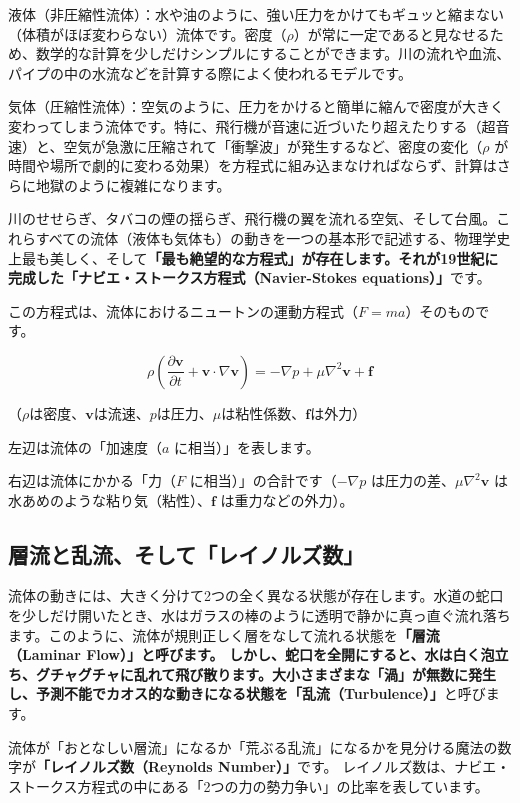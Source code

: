 液体（非圧縮性流体）：水や油のように、強い圧力をかけてもギュッと縮まない（体積がほぼ変わらない）流体です。密度（\ensuremath{\rho}）が常に一定であると見なせるため、数学的な計算を少しだけシンプルにすることができます。川の流れや血流、パイプの中の水流などを計算する際によく使われるモデルです。

気体（圧縮性流体）：空気のように、圧力をかけると簡単に縮んで密度が大きく変わってしまう流体です。特に、飛行機が音速に近づいたり超えたりする（超音速）と、空気が急激に圧縮されて「衝撃波」が発生するなど、密度の変化（\ensuremath{\rho} が時間や場所で劇的に変わる効果）を方程式に組み込まなければならず、計算はさらに地獄のように複雑になります。

川のせせらぎ、タバコの煙の揺らぎ、飛行機の翼を流れる空気、そして台風。これらすべての流体（液体も気体も）の動きを一つの基本形で記述する、物理学史上最も美しく、そして\textbf{「最も絶望的な方程式」が存在します。それが19世紀に完成した「ナビエ・ストークス方程式（Navier-Stokes equations）」}です。

この方程式は、流体におけるニュートンの運動方程式（\(F=ma\)）そのものです。

\[
\rho\left(\frac{\partial \mathbf{v}}{\partial t}
+ \mathbf{v}\cdot\nabla \mathbf{v}\right)
= -\nabla p + \mu \nabla^2 \mathbf{v} + \mathbf{f}
\]

（\(\rho\)は密度、\(\mathbf{v}\)は流速、\(p\)は圧力、\(\mu\)は粘性係数、\(\mathbf{f}\)は外力）

左辺は流体の「加速度（\(a\) に相当）」を表します。

右辺は流体にかかる「力（\(F\) に相当）」の合計です（\(-\nabla p\) は圧力の差、\ensuremath{\mu\nabla^2\mathbf{v}} は水あめのような粘り気（粘性）、\ensuremath{\mathbf{f}} は重力などの外力）。

\subsection{層流と乱流、そして「レイノルズ数」}

流体の動きには、大きく分けて2つの全く異なる状態が存在します。水道の蛇口を少しだけ開いたとき、水はガラスの棒のように透明で静かに真っ直ぐ流れ落ちます。このように、流体が規則正しく層をなして流れる状態を\textbf{「層流（Laminar Flow）」と呼びます。 しかし、蛇口を全開にすると、水は白く泡立ち、グチャグチャに乱れて飛び散ります。大小さまざまな「渦」が無数に発生し、予測不能でカオス的な動きになる状態を「乱流（Turbulence）」}と呼びます。

流体が「おとなしい層流」になるか「荒ぶる乱流」になるかを見分ける魔法の数字が\textbf{「レイノルズ数（Reynolds Number）」}です。 レイノルズ数は、ナビエ・ストークス方程式の中にある「2つの力の勢力争い」の比率を表しています。

